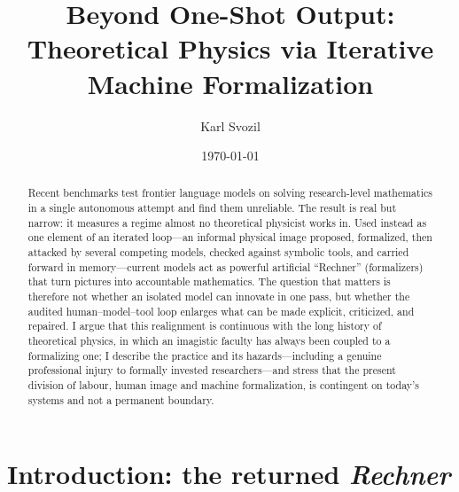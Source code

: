 \documentclass[
  aps,
  reprint,
  superscriptaddress,
  floatfix,
  nofootinbib,
  longbibliography
]{revtex4-2}
\begin{document}

\title{Beyond One-Shot Output: Theoretical Physics via Iterative
Machine Formalization}

\author{Karl Svozil}

\date{\today}

\begin{abstract}
Recent benchmarks test frontier language models on solving research-level
mathematics in a single autonomous attempt and find them unreliable. The result
is real but narrow: it measures a regime almost no theoretical physicist works
in. Used instead as one element of an iterated loop---an informal physical image
proposed, formalized, then attacked by several competing models, checked against
symbolic tools, and carried forward in memory---current models act as powerful
artificial ``Rechner'' (formalizers) that turn pictures into accountable
mathematics. The question that matters is therefore not whether an isolated model
can innovate in one pass, but whether the audited human--model--tool loop
enlarges what can be made explicit, criticized, and repaired. I argue that this
realignment is continuous with the long history of theoretical physics, in which
an imagistic faculty has always been coupled to a formalizing one; I describe the
practice and its hazards---including a genuine professional injury to formally
invested researchers---and stress that the present division of labour, human
image and machine formalization, is contingent on today's systems and not a
permanent boundary.
\end{abstract}

\maketitle

\section{Introduction: the returned \emph{Rechner}}
\label{sec:introduction}
\end{document}
